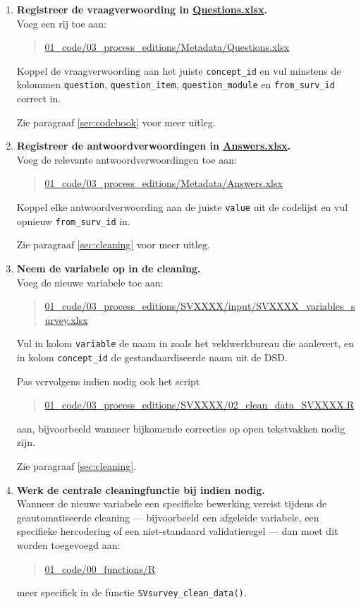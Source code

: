 \documentclass{VSAnote}
\begin{document}
\begin{enumerate}
\item \textbf{Registreer de vraagverwoording in \url{Questions.xlsx}.}\\
Voeg een rij toe aan:
\begin{quote}
\url{01_code/03_process_editions/Metadata/Questions.xlsx}
\end{quote}

Koppel de vraagverwoording aan het juiste \verb+concept_id+ en vul minstens de kolommen \verb+question+, \verb+question_item+, \verb+question_module+ en \verb+from_surv_id+ correct in.

Zie paragraaf \ref{sec:codebook} voor meer uitleg.

\item \textbf{Registreer de antwoordverwoordingen in \url{Answers.xlsx}.}\\
Voeg de relevante antwoordverwoordingen toe aan:
\begin{quote}
\url{01_code/03_process_editions/Metadata/Answers.xlsx}
\end{quote}

Koppel elke antwoordverwoording aan de juiste \verb+value+ uit de codelijst en vul opnieuw \verb+from_surv_id+ in.

Zie paragraaf \ref{sec:cleaning} voor meer uitleg.

\item \textbf{Neem de variabele op in de cleaning.}\\
Voeg de nieuwe variabele toe aan:
\begin{quote}
\url{01_code/03_process_editions/SVXXXX/input/SVXXXX_variables_survey.xlsx}
\end{quote}

Vul in kolom \verb+variable+ de naam in zoals het veldwerkbureau die aanlevert, en in kolom \verb+concept_id+ de gestandaardiseerde naam uit de DSD.

Pas vervolgens indien nodig ook het script
\begin{quote}
\url{01_code/03_process_editions/SVXXXX/02_clean_data_SVXXXX.R}
\end{quote}
aan, bijvoorbeeld wanneer bijkomende correcties op open tekstvakken nodig zijn.

Zie paragraaf \ref{sec:cleaning}.

\item \textbf{Werk de centrale cleaningfunctie bij indien nodig.}\\
Wanneer de nieuwe variabele een specifieke bewerking vereist tijdens de geautomatiseerde cleaning --- bijvoorbeeld een afgeleide variabele, een specifieke hercodering of een niet-standaard validatieregel --- dan moet dit worden toegevoegd aan:
\begin{quote}
\url{01_code/00_functions/R}
\end{quote}
meer specifiek in de functie \verb+SVsurvey_clean_data()+.


\end{enumerate}
\end{document}
